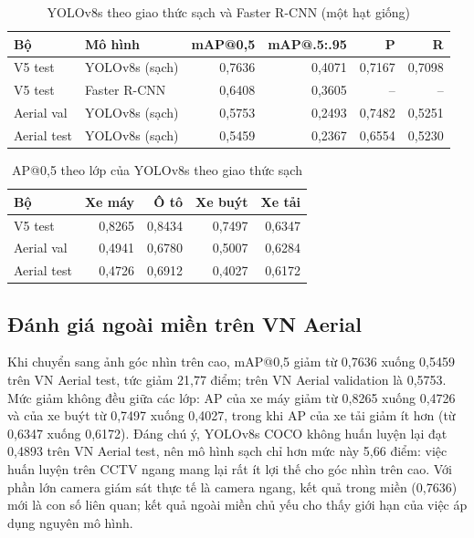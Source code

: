 \documentclass[10pt,journal,letterpaper]{IEEEtran}
\begin{document}
\begin{table}[!t]
\caption{YOLOv8s theo giao thức sạch và Faster R-CNN (một hạt giống)}
\label{tab:clean}
\centering
\footnotesize
\setlength{\tabcolsep}{3pt}
\begin{tabular}{llrrrr}
\toprule
Bộ & Mô hình & mAP@0,5 & mAP@.5:.95 & P & R \\
\midrule
V5 test & YOLOv8s (sạch) & 0,7636 & 0,4071 & 0,7167 & 0,7098 \\
V5 test & Faster R-CNN & 0,6408 & 0,3605 & -- & -- \\
Aerial val & YOLOv8s (sạch) & 0,5753 & 0,2493 & 0,7482 & 0,5251 \\
Aerial test & YOLOv8s (sạch) & 0,5459 & 0,2367 & 0,6554 & 0,5230 \\
\bottomrule
\end{tabular}
\end{table}

\begin{table}[!t]
\caption{AP@0,5 theo lớp của YOLOv8s theo giao thức sạch}
\label{tab:cleancls}
\centering
\footnotesize
\begin{tabular}{lrrrr}
\toprule
Bộ & Xe máy & Ô tô & Xe buýt & Xe tải \\
\midrule
V5 test & 0,8265 & 0,8434 & 0,7497 & 0,6347 \\
Aerial val & 0,4941 & 0,6780 & 0,5007 & 0,6284 \\
Aerial test & 0,4726 & 0,6912 & 0,4027 & 0,6172 \\
\bottomrule
\end{tabular}
\end{table}

\subsection{Đánh giá ngoài miền trên VN Aerial}
Khi chuyển sang ảnh góc nhìn trên cao, mAP@0,5 giảm từ 0,7636 xuống 0,5459 trên VN Aerial test, tức giảm 21,77 điểm; trên VN Aerial validation là 0,5753. Mức giảm không đều giữa các lớp: AP của xe máy giảm từ 0,8265 xuống 0,4726 và của xe buýt từ 0,7497 xuống 0,4027, trong khi AP của xe tải giảm ít hơn (từ 0,6347 xuống 0,6172). Đáng chú ý, YOLOv8s COCO không huấn luyện lại đạt 0,4893 trên VN Aerial test, nên mô hình sạch chỉ hơn mức này 5,66 điểm: việc huấn luyện trên CCTV ngang mang lại rất ít lợi thế cho góc nhìn trên cao. Với phần lớn camera giám sát thực tế là camera ngang, kết quả trong miền (0,7636) mới là con số liên quan; kết quả ngoài miền chủ yếu cho thấy giới hạn của việc áp dụng nguyên mô hình.
\end{document}
